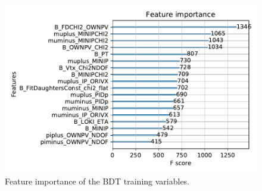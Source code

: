 \begin{figure}
  \centering
  \includegraphics[width = .7\textwidth]{"content/plots/BDT/feature_importance.pdf"}
  \caption{Feature importance of the BDT training variables.}
  \label{fig:feature_importance}
\end{figure}


